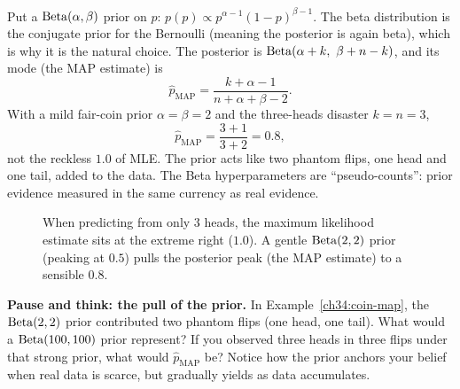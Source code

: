 \begin{example}
\label{ch34:coin-map}
Put a $\operatorname{Beta}(\alpha,\beta)$ prior on $p$: $p(p)\propto p^{\alpha-1}(1-p)^{\beta-1}$.
The beta distribution is the conjugate prior for the Bernoulli (meaning the posterior is again beta),
which is why it is the natural choice. The posterior is
$\Bet(\alpha+k,\ \beta+n-k)$, and its mode (the MAP estimate) is
\[
  \hat p_{\text{MAP}} = \frac{k + \alpha - 1}{n + \alpha + \beta - 2}.
\]
With a mild fair-coin prior $\alpha=\beta=2$ and the three-heads disaster
$k=n=3$,
\[
  \hat p_{\text{MAP}} = \frac{3 + 1}{3 + 2} = 0.8,
\]
not the reckless $1.0$ of MLE. The prior acts like two phantom flips, one head and
one tail, added to the data. The Beta hyperparameters are ``pseudo-counts'': prior
evidence measured in the same currency as real evidence.
\end{example}

\begin{figure}[H]
\centering
{}
\caption{When predicting from only $3$ heads, the maximum likelihood estimate sits at the extreme right ($1.0$). A gentle $\operatorname{Beta}(2,2)$ prior (peaking at $0.5$) pulls the posterior peak (the MAP estimate) to a sensible $0.8$.}
\label{ch34:fig-map}
\end{figure}

\begin{recoverybox}
\textbf{Pause and think: the pull of the prior.}
In Example~\ref{ch34:coin-map}, the $\operatorname{Beta}(2,2)$ prior contributed two phantom flips (one head, one tail). What would a $\operatorname{Beta}(100, 100)$ prior represent? If you observed three heads in three flips under that strong prior, what would $\hat p_{\text{MAP}}$ be? Notice how the prior anchors your belief when real data is scarce, but gradually yields as data accumulates.
\end{recoverybox}

